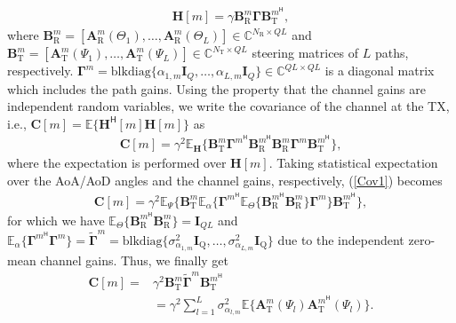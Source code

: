 \documentclass[journal,10pt]{IEEEtran}
\begin{document}
	{\color{black}
		\begin{align}
		\mathbf{H}[m] = \gamma \mathbf{B}_\mathrm{R}^m\boldsymbol{\Gamma} \mathbf{B}_\mathrm{T}^{m^\textsf{H}},
		\end{align}
		where $\mathbf{B}_\mathrm{R}^m = [\mathbf{A}_\mathrm{R}^m(\Theta_{1}),\dots, \mathbf{A}_\mathrm{R}^m(\Theta_{L})]\in \mathbb{C}^{N_\mathrm{R}\times QL}$ and $\mathbf{B}_\mathrm{T}^m = [\mathbf{A}_\mathrm{T}^m(\Psi_1),\dots, \mathbf{A}_\mathrm{T}^m(\Psi_L)]\in \mathbb{C}^{N_\mathrm{T}\times QL}$  steering matrices of $L$ paths, respectively. $\boldsymbol{\Gamma}^m = \mathrm{blkdiag}\{\alpha_{1,m} \mathbf{I}_Q,\dots,\alpha_{L,m} \mathbf{I}_Q  \}\in \mathbb{C}^{QL\times QL}$ is a diagonal matrix which includes the path gains. Using the property that the channel gains are independent random variables, we write the covariance of the channel at the TX, i.e.,  $\mathbf{C}[m] = \mathbb{E}\{\mathbf{H}^\textsf{H}[m] \mathbf{H}[m]  \}$ as
		\begin{align}
		\label{Cov1}
		\mathbf{C}[m] = \gamma^2 \mathbb{E}_\mathbf{H} \{ \mathbf{B}_\mathrm{T}^m \boldsymbol{\Gamma}^{m^\textsf{H}} \mathbf{B}_\mathrm{R}^{m^\textsf{H}} \mathbf{B}_\mathrm{R}^m \boldsymbol{\Gamma}^m \mathbf{B}_\mathrm{T}^{m^\textsf{H}}  \},
		\end{align}
		where the expectation is performed over $\mathbf{H}[m]$. Taking statistical expectation over the AoA/AoD angles and the channel gains, respectively, (\ref{Cov1}) becomes
		\begin{align}
		\mathbf{C}[m] = \gamma^2 \mathbb{E}_{\Psi} \{ \mathbf{B}_\mathrm{T}^m \mathbb{E}_{\alpha}\{    \boldsymbol{\Gamma}^{m^\textsf{H}} \mathbb{E}_{\Theta} \{\mathbf{B}_\mathrm{R}^{m^\textsf{H}} \mathbf{B}_\mathrm{R}^m \} \boldsymbol{\Gamma}^m \} \mathbf{B}_\mathrm{T}^{m^\textsf{H}}  \}, 
		\end{align}
		for which we have $\mathbb{E}_{\Theta} \{\mathbf{B}_\mathrm{R}^{m^\textsf{H}} \mathbf{B}_\mathrm{R}^m \} = \mathbf{I}_{QL}$ and $\mathbb{E}_{\alpha}\{    \boldsymbol{\Gamma}^{m^\textsf{H}}  \boldsymbol{\Gamma}^m \} = \widetilde{\boldsymbol{\Gamma}}^m= \mathrm{blkdiag}\{ \sigma_{\alpha_{1,m}}^2 \mathbf{I}_\mathrm{Q},\dots,\sigma_{\alpha_{L,m}}^2\mathbf{I}_\mathrm{Q}  \}$ due to the independent zero-mean channel gains. Thus, we finally get
		\begin{align}
		\label{covariance}
		\mathbf{C}[m] =& \gamma^2 \mathbf{B}_\mathrm{T}^m\widetilde{\boldsymbol{\Gamma}}^m\mathbf{B}_\mathrm{T}^{m^\textsf{H}} \nonumber \\
		&=\gamma^2 \sum_{l=1}^{L}\sigma_{\alpha_{l,m}}^2 \mathbb{E}\{\mathbf{A}_\mathrm{T}^m(\Psi_l) \mathbf{A}_\mathrm{T}^{m^\textsf{H}}(\Psi_l)  \}.

\end{align}}
\end{document}
